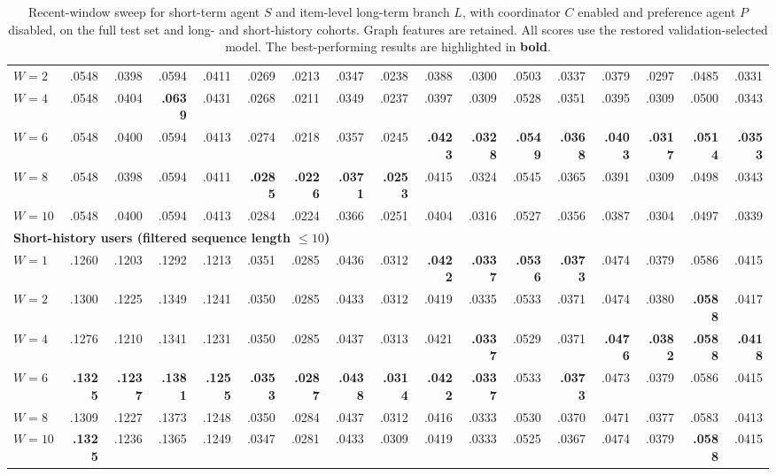 ﻿\documentclass[sigconf,anonymous,review]{acmart}
\begin{document}
\begin{table}[!tbp]
{\begin{tabular}{l*{4}{rrrr}}
        $W=2$ & .0548 & .0398 & .0594 & .0411 & .0269 & .0213 & .0347 & .0238 & .0388 & .0300 & .0503 & .0337 & .0379 & .0297 & .0485 & .0331 \\
        $W=4$ & .0548 & .0404 & \textbf{.0639} & .0431 & .0268 & .0211 & .0349 & .0237 & .0397 & .0309 & .0528 & .0351 & .0395 & .0309 & .0500 & .0343 \\
        $W=6$ & .0548 & .0400 & .0594 & .0413 & .0274 & .0218 & .0357 & .0245 & \textbf{.0423} & \textbf{.0328} & \textbf{.0549} & \textbf{.0368} & \textbf{.0403} & \textbf{.0317} & \textbf{.0514} & \textbf{.0353} \\
        $W=8$ & .0548 & .0398 & .0594 & .0411 & \textbf{.0285} & \textbf{.0226} & \textbf{.0371} & \textbf{.0253} & .0415 & .0324 & .0545 & .0365 & .0391 & .0309 & .0498 & .0343 \\
        $W=10$ & .0548 & .0400 & .0594 & .0413 & .0284 & .0224 & .0366 & .0251 & .0404 & .0316 & .0527 & .0356 & .0387 & .0304 & .0497 & .0339 \\
        \midrule
        \multicolumn{17}{l}{\textbf{Short-history users (filtered sequence length $\leq10$)}} \\
        $W=1$ & .1260 & .1203 & .1292 & .1213 & .0351 & .0285 & .0436 & .0312 & \textbf{.0422} & \textbf{.0337} & \textbf{.0536} & \textbf{.0373} & .0474 & .0379 & .0586 & .0415 \\
        $W=2$ & .1300 & .1225 & .1349 & .1241 & .0350 & .0285 & .0433 & .0312 & .0419 & .0335 & .0533 & .0371 & .0474 & .0380 & \textbf{.0588} & .0417 \\
        $W=4$ & .1276 & .1210 & .1341 & .1231 & .0350 & .0285 & .0437 & .0313 & .0421 & \textbf{.0337} & .0529 & .0371 & \textbf{.0476} & \textbf{.0382} & \textbf{.0588} & \textbf{.0418} \\
        $W=6$ & \textbf{.1325} & \textbf{.1237} & \textbf{.1381} & \textbf{.1255} & \textbf{.0353} & \textbf{.0287} & \textbf{.0438} & \textbf{.0314} & \textbf{.0422} & \textbf{.0337} & .0533 & \textbf{.0373} & .0473 & .0379 & .0586 & .0415 \\
        $W=8$ & .1309 & .1227 & .1373 & .1248 & .0350 & .0284 & .0437 & .0312 & .0416 & .0333 & .0530 & .0370 & .0471 & .0377 & .0583 & .0413 \\
        $W=10$ & \textbf{.1325} & .1236 & .1365 & .1249 & .0347 & .0281 & .0433 & .0309 & .0419 & .0333 & .0525 & .0367 & .0474 & .0379 & \textbf{.0588} & .0415 \\
        \bottomrule
    \end{tabular}%
    }
    \caption{Recent-window sweep for short-term agent $S$ and item-level long-term branch $L$, with coordinator $C$ enabled and preference agent $P$ disabled, on the full test set and long- and short-history cohorts. Graph features are retained. All scores use the restored validation-selected model. The best-performing results are highlighted in \textbf{bold}.}
    \label{tab:long_short_window}
\end{table}
\end{document}
